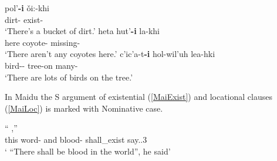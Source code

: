 \begin{exe} \ex\label{WapExist}
\begin{xlist}
 \ex\gll pol'\textbf{-i} \v oi:-khi\textglotstop\\
 dirt-\nom{} exist-\stat{}\\
\glt `There's a bucket of dirt.'
  \ex\gll heta hut'\textbf{-i} la-khi\textglotstop\\
 here coyote-\nom{} missing-\stat{}\\
\glt `There aren't any coyotes here.'
 \ex\gll c'ic'a-t\textbf{-i} hol-wil'uh le\textglotstop a-hki\textglotstop\\
 bird-\pl{}-\nom{} tree-on many-\stat{}\\
\glt `There are lots of birds on the tree.'
 
\end{xlist}
\end{exe}

In Maidu the S argument of existential (\ref{MaiExist}) and locational clauses (\ref{MaiLoc}) is marked with Nominative case.  

\begin{exe}\ex\label{MaiExist}
\gll ``    ,'' \\
this word-\loc{} and blood-\nom{} shall\_exist say.\pst{}.3\sg{}\\
\glt ` ``There shall be blood in the world'', he said' 
\end{exe}
 

